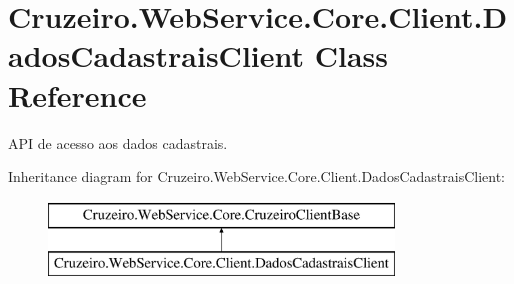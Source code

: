 \hypertarget{class_cruzeiro_1_1_web_service_1_1_core_1_1_client_1_1_dados_cadastrais_client}{}\section{Cruzeiro.\+Web\+Service.\+Core.\+Client.\+Dados\+Cadastrais\+Client Class Reference}
\label{class_cruzeiro_1_1_web_service_1_1_core_1_1_client_1_1_dados_cadastrais_client}


A\+PI de acesso aos dados cadastrais.  


Inheritance diagram for Cruzeiro.\+Web\+Service.\+Core.\+Client.\+Dados\+Cadastrais\+Client\+:\begin{figure}[H]
\begin{center}
\leavevmode
\includegraphics[height=2.000000cm]{class_cruzeiro_1_1_web_service_1_1_core_1_1_client_1_1_dados_cadastrais_client}
\end{center}
\end{figure}
